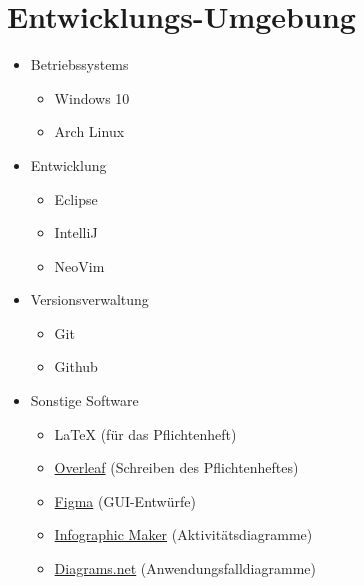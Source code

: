 \section{Entwicklungs-Umgebung}
        \begin{itemize}[noitemsep]
            \item \glspl{Betriebssystem} 
                \begin{itemize}[noitemsep]
                    \item Windows 10
                    \item Arch Linux
                \end{itemize}
            \item Entwicklung %
            \begin{itemize}[noitemsep]
                \item Eclipse
                \item IntelliJ
                \item NeoVim
            \end{itemize}
            \item \gls{Versionsverwaltung}
                \begin{itemize}[noitemsep]
                    \item Git
                    \item Github
                \end{itemize}
            \item Sonstige Software
                \begin{itemize}[noitemsep]
                    \item \LaTeX \hspace{0.1cm} (für das Pflichtenheft)
                    \item \href{https://de.overleaf.com}{Overleaf} (Schreiben des Pflichtenheftes)
                    \item \href{https://www.figma.com}{Figma} (GUI-Entwürfe)
                    \item \href{https://online.visual-paradigm.com/}{Infographic Maker} (Aktivitätsdiagramme)
                    \item \href{https://app.diagrams.net/}{Diagrams.net} (Anwendungsfalldiagramme)
                \end{itemize}
        \end{itemize}
